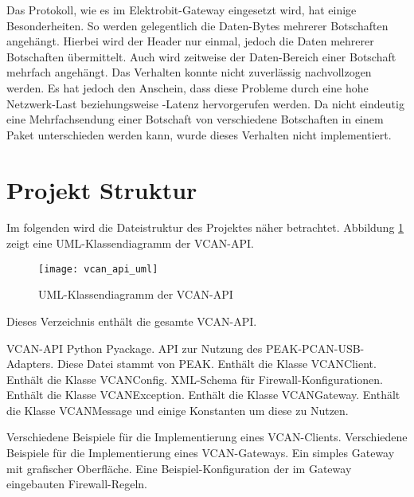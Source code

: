 Das Protokoll, wie es im Elektrobit-Gateway eingesetzt wird, hat einige Besonderheiten. So werden gelegentlich die Daten-Bytes mehrerer Botschaften angehängt. Hierbei wird der Header nur einmal, jedoch die Daten mehrerer Botschaften übermittelt. Auch wird zeitweise der Daten-Bereich einer Botschaft mehrfach angehängt. Das Verhalten konnte nicht zuverlässig nachvollzogen werden. Es hat jedoch den Anschein, dass diese Probleme durch eine hohe Netzwerk-Last beziehungsweise -Latenz hervorgerufen werden. Da nicht eindeutig eine Mehrfachsendung einer Botschaft von verschiedene Botschaften in einem Paket unterschieden werden kann, wurde dieses Verhalten nicht implementiert. 


\section{Projekt Struktur}
\label{sec:vcan_struktur}

Im folgenden wird die Dateistruktur des Projektes näher betrachtet. Abbildung \ref{fig:vcan_api_uml} zeigt eine UML-Klassendiagramm der VCAN-API.

\begin{figure}[ht]
\centering
\texttt{[image: vcan\_api\_uml]}
\caption{UML-Klassendiagramm der VCAN-API}
\label{fig:vcan_api_uml}
\end{figure}

\begin{description}
    Dieses Verzeichnis enthält die gesamte VCAN-API.
    \begin{description}
        VCAN-API Python Pyackage.
        API zur Nutzung des PEAK-PCAN-USB-Adapters. Diese Datei stammt von PEAK.
        Enthält die Klasse VCANClient.
        Enthält die Klasse VCANConfig.
        XML-Schema für Firewall-Konfigurationen.
        Enthält die Klasse VCANException.
        Enthält die Klasse VCANGateway.
        Enthält die Klasse VCANMessage und einige Konstanten um diese zu Nutzen.
    \end{description}
    Verschiedene Beispiele für die Implementierung eines VCAN-Clients.
    Verschiedene Beispiele für die Implementierung eines VCAN-Gateways.
    Ein simples Gateway mit grafischer Oberfläche.
    Eine Beispiel-Konfiguration der im Gateway eingebauten Firewall-Regeln.
\end{description}


